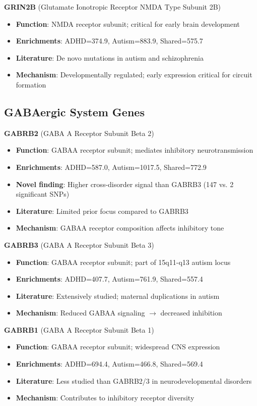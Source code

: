 \documentclass[12pt,letterpaper]{article}
\begin{document}
\textbf{GRIN2B} (Glutamate Ionotropic Receptor NMDA Type Subunit 2B)
\begin{itemize}
    \item \textbf{Function}: NMDA receptor subunit; critical for early brain development
    \item \textbf{Enrichments}: ADHD=374.9, Autism=883.9, Shared=575.7
    \item \textbf{Literature}: De novo mutations in autism and schizophrenia
    \item \textbf{Mechanism}: Developmentally regulated; early expression critical for circuit formation
\end{itemize}

\subsection{GABAergic System Genes}

\textbf{GABRB2} (GABA A Receptor Subunit Beta 2)
\begin{itemize}
    \item \textbf{Function}: GABAA receptor subunit; mediates inhibitory neurotransmission
    \item \textbf{Enrichments}: ADHD=587.0, Autism=1017.5, Shared=772.9
    \item \textbf{Novel finding}: Higher cross-disorder signal than GABRB3 (147 vs. 2 significant SNPs)
    \item \textbf{Literature}: Limited prior focus compared to GABRB3
    \item \textbf{Mechanism}: GABAA receptor composition affects inhibitory tone
\end{itemize}

\textbf{GABRB3} (GABA A Receptor Subunit Beta 3)
\begin{itemize}
    \item \textbf{Function}: GABAA receptor subunit; part of 15q11-q13 autism locus
    \item \textbf{Enrichments}: ADHD=407.7, Autism=761.9, Shared=557.4
    \item \textbf{Literature}: Extensively studied; maternal duplications in autism
    \item \textbf{Mechanism}: Reduced GABAA signaling $\rightarrow$ decreased inhibition
\end{itemize}

\textbf{GABRB1} (GABA A Receptor Subunit Beta 1)
\begin{itemize}
    \item \textbf{Function}: GABAA receptor subunit; widespread CNS expression
    \item \textbf{Enrichments}: ADHD=694.4, Autism=466.8, Shared=569.4
    \item \textbf{Literature}: Less studied than GABRB2/3 in neurodevelopmental disorders
    \item \textbf{Mechanism}: Contributes to inhibitory receptor diversity
\end{itemize}
\end{document}
